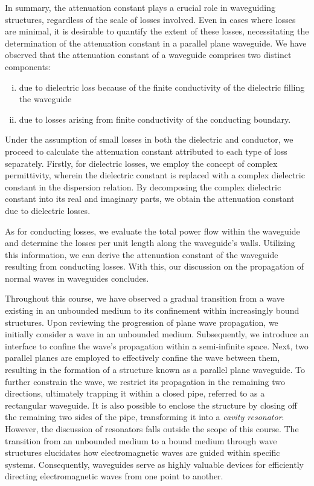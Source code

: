 In summary, the attenuation constant plays a crucial role in waveguiding structures, regardless of the scale of losses involved. Even in cases where losses are minimal, it is desirable to quantify the extent of these losses, necessitating the determination of the attenuation constant in a parallel plane waveguide. We have observed that the attenuation constant of a waveguide comprises two distinct components:
\begin{enumerate}[(i)]
\item due to dielectric loss because of the finite conductivity of the dielectric filling the waveguide
\item due to losses arising from finite conductivity of the conducting boundary.
\end{enumerate}
Under the assumption of small losses in both the dielectric and conductor, we proceed to calculate the attenuation constant attributed to each type of loss separately. Firstly, for dielectric losses, we employ the concept of complex permittivity, wherein the dielectric constant is replaced with a complex dielectric constant in the dispersion relation. By decomposing the complex dielectric constant into its real and imaginary parts, we obtain the attenuation constant due to dielectric losses.

As for conducting losses, we evaluate the total power flow within the waveguide and determine the losses per unit length along the waveguide's walls. Utilizing this information, we can derive the attenuation constant of the waveguide resulting from conducting losses. With this, our discussion on the propagation of normal waves in waveguides concludes.

Throughout this course, we have observed a gradual transition from a wave existing in an unbounded medium to its confinement within increasingly bound structures. Upon reviewing the progression of plane wave propagation, we initially consider a wave in an unbounded medium. Subsequently, we introduce an interface to confine the wave's propagation within a semi-infinite space. Next, two parallel planes are employed to effectively confine the wave between them, resulting in the formation of a structure known as a parallel plane waveguide. To further constrain the wave, we restrict its propagation in the remaining two directions, ultimately trapping it within a closed pipe, referred to as a rectangular waveguide. It is also possible to enclose the structure by closing off the remaining two sides of the pipe, transforming it into a \emph{cavity resonator}. However, the discussion of resonators falls outside the scope of this course. The transition from an unbounded medium to a bound medium through wave structures elucidates how electromagnetic waves are guided within specific systems. Consequently, waveguides serve as highly valuable devices for efficiently directing electromagnetic waves from one point to another.
